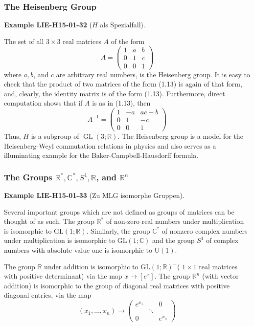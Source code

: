 \documentclass[10pt, letterpaper]{article}
\newcommand{\CustomHeading}[3]{%
  \par\medskip\noindent%
  \textbf{#1 #2} \textnormal{(#3)}.\enskip%
}
\newenvironment{EXA}[2]{\begin{unitbox}\CustomHeading{Example}{#1}{#2}}{\end{unitbox}}
\begin{document}
\subsubsection*{The Heisenberg Group}


\begin{EXA}{LIE-H15-01-32}{$H$ als Spezialfall}
The set of all $3 \times 3$ real matrices $A$ of the form
$$
A=\left(\begin{array}{lll}
1 & a & b \\
0 & 1 & c \\
0 & 0 & 1
\end{array}\right)
$$
where $a, b$, and $c$ are arbitrary real numbers, is the Heisenberg group. It is easy to check that the product of two matrices of the form (1.13) is again of that form, and, clearly, the identity matrix is of the form (1.13). Furthermore, direct computation shows that if $A$ is as in (1.13), then
$$
A^{-1}=\left(\begin{array}{ccc}
1 & -a & a c-b \\
0 & 1 & -c \\
0 & 0 & 1
\end{array}\right)
$$
Thus, $H$ is a subgroup of $\operatorname{GL}(3 ; \mathbb{R})$. The Heisenberg group is a model for the Heisenberg-Weyl commutation relations in physics and also serves as a illuminating example for the Baker-Campbell-Hausdorff formula.
\end{EXA}



\subsubsection*{The Groups $\mathbb{R}^{*}, \mathbb{C}^{*}, S^{1}, \mathbb{R}$, and $\mathbb{R}^{n}$}


\begin{EXA}{LIE-H15-01-33}{Zu MLG isomorphe Gruppen}
Several important groups which are not defined as groups of matrices can be thought of as such. The group $\mathbb{R}^{*}$ of non-zero real numbers under multiplication is isomorphic to $\mathrm{GL}(1 ; \mathbb{R})$. Similarly, the group $\mathbb{C}^{*}$ of nonzero complex numbers under multiplication is isomorphic to $\mathrm{GL}(1 ; \mathbb{C})$ and the group $S^{1}$ of complex numbers with absolute value one is isomorphic to $\mathrm{U}(1)$.

The group $\mathbb{R}$ under addition is isomorphic to $\mathrm{GL}(1 ; \mathbb{R})^{+}$( $1 \times 1$ real matrices with positive determinant) via the map $x \rightarrow\left[e^{x}\right]$. The group $\mathbb{R}^{n}$ (with vector addition) is isomorphic to the group of diagonal real matrices with positive diagonal entries, via the map
$$
\left(x_{1}, \ldots, x_{n}\right) \rightarrow\left(\begin{array}{ccc}
e^{x_{1}} & & 0 \\
& \ddots & \\
0 & & e^{x_{n}}
\end{array}\right)
$$
\end{EXA}
\end{document}

